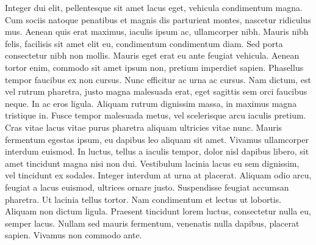 \documentclass{article}
\newcounter{notes}
\newcommand{\notes}{\textbf{\thenotes}}
\begin{document}
{{ Integer dui elit, pellentesque sit amet lacus eget, vehicula condimentum magna. \notes
 Cum sociis natoque penatibus et magnis dis parturient montes, nascetur ridiculus mus. \notes
 Aenean quis erat maximus, iaculis ipsum ac, ullamcorper nibh. \notes
 Mauris nibh felis, facilisis sit amet elit eu, condimentum condimentum diam. \notes
 Sed porta consectetur nibh non mollis. \notes
 Mauris eget erat eu ante feugiat vehicula. \notes
 Aenean tortor enim, commodo sit amet ipsum non, pretium imperdiet sapien. \notes
 Phasellus tempor faucibus ex non cursus. \notes
 Nunc efficitur ac urna ac cursus. \notes
 Nam dictum, est vel rutrum pharetra, justo magna malesuada erat, eget sagittis sem orci faucibus neque. \notes
 In ac eros ligula. \notes
 Aliquam rutrum dignissim massa, in maximus magna tristique in. \notes
 Fusce tempor malesuada metus, vel scelerisque arcu iaculis pretium. \notes
 Cras vitae lacus vitae purus pharetra aliquam ultricies vitae nunc. \notes
 Mauris fermentum egestas ipsum, eu dapibus leo aliquam sit amet. \notes
 Vivamus ullamcorper interdum euismod. \notes
 In luctus, tellus a iaculis tempor, dolor nisl dapibus libero, sit amet tincidunt magna nisi non dui. \notes
 Vestibulum lacinia lacus eu sem dignissim, vel tincidunt ex sodales. \notes
 Integer interdum at urna at placerat. \notes
 Aliquam odio arcu, feugiat a lacus euismod, ultrices ornare justo. \notes
 Suspendisse feugiat accumsan pharetra. \notes
 Ut lacinia tellus tortor. \notes
 Nam condimentum et lectus ut lobortis. \notes
 Aliquam non dictum ligula. \notes
 Praesent tincidunt lorem luctus, consectetur nulla eu, semper lacus. \notes
 Nullam sed mauris fermentum, venenatis nulla dapibus, placerat sapien. \notes
 Vivamus non commodo ante.
}}

\pend
\endnumbering
\end{document}
